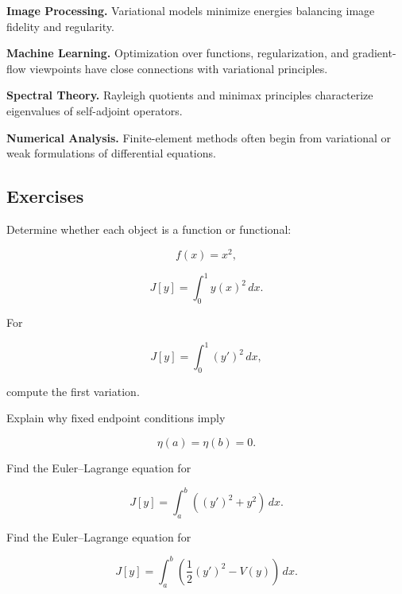 \begin{applicationbox}
\medskip

\textbf{Image Processing.}
Variational models minimize energies balancing image fidelity and
regularity.

\medskip

\textbf{Machine Learning.}
Optimization over functions, regularization, and gradient-flow viewpoints
have close connections with variational principles.

\medskip

\textbf{Spectral Theory.}
Rayleigh quotients and minimax principles characterize eigenvalues of
self-adjoint operators.

\medskip

\textbf{Numerical Analysis.}
Finite-element methods often begin from variational or weak formulations
of differential equations.
\end{applicationbox}

\subsection{Exercises}
\label{subsec:calculus-variations-exercises}

\begin{exercise}[1]
Determine whether each object is a function or functional:

\[
f(x)=x^2,
\]

\[
J[y]=\int_0^1y(x)^2\,dx.
\]
\end{exercise}

\begin{exercise}[1]
For

\[
J[y]
=
\int_0^1
(y')^2\,dx,
\]

compute the first variation.
\end{exercise}

\begin{exercise}[1]
Explain why fixed endpoint conditions imply

\[
\eta(a)=\eta(b)=0.
\]
\end{exercise}

\begin{exercise}[1]
Find the Euler--Lagrange equation for

\[
J[y]
=
\int_a^b
\left(
(y')^2+y^2
\right)\,dx.
\]
\end{exercise}

\begin{exercise}[1]
Find the Euler--Lagrange equation for

\[
J[y]
=
\int_a^b
\left(
\frac12(y')^2-V(y)
\right)\,dx.
\]
\end{exercise}

